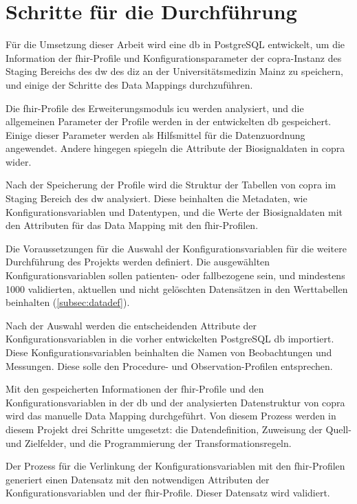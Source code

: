 \section{Schritte für die Durchführung} \label{sec:steps}

Für die Umsetzung dieser Arbeit wird eine \ac{db} in PostgreSQL entwickelt, um die Information der \ac{fhir}-Profile und Konfigurationsparameter der \ac{copra}-Instanz des Staging Bereichs des \ac{dw} des \ac{diz} an der Universitätsmedizin Mainz zu speichern, und einige der Schritte des Data Mappings durchzuführen.

Die \ac{fhir}-Profile des Erweiterungsmoduls \glqq\ac{icu}\grqq{} werden analysiert, und die allgemeinen Parameter der Profile werden in der entwickelten \ac{db} gespeichert. Einige dieser Parameter werden als Hilfsmittel für die Datenzuordnung angewendet. Andere hingegen spiegeln die Attribute der Biosignaldaten in \ac{copra} wider.

Nach der Speicherung der Profile wird die Struktur der Tabellen von \ac{copra} im Staging Bereich des \ac{dw} analysiert. Diese beinhalten die Metadaten, wie Konfigurationsvariablen und Datentypen, und die Werte der Biosignaldaten mit den Attributen für das Data Mapping mit den \ac{fhir}-Profilen. 

Die Voraussetzungen für die Auswahl der Konfigurationsvariablen für die weitere Durchführung des Projekts werden definiert. Die ausgewählten Konfigurationsvariablen sollen patienten- oder fallbezogene sein, und mindestens 1000 validierten, aktuellen und nicht gelöschten Datensätzen in den Werttabellen beinhalten (\ref{subsec:datadef}).

Nach der Auswahl werden die entscheidenden Attribute der Konfigurationsvariablen in die vorher entwickelten PostgreSQL \ac{db} importiert. Diese Konfigurationsvariablen beinhalten die Namen von Beobachtungen und Messungen. Diese solle den \glqq Procedure\grqq{}- und \glqq Observation\grqq{}-Profilen entsprechen.

Mit den gespeicherten Informationen der \ac{fhir}-Profile und den Konfigurationsvariablen in der \ac{db} und der analysierten Datenstruktur von \ac{copra} wird das manuelle Data Mapping durchgeführt. Von diesem Prozess werden in diesem Projekt drei Schritte umgesetzt: die Datendefinition, Zuweisung der Quell- und Zielfelder, und die Programmierung der Transformationsregeln.

Der Prozess für die Verlinkung der Konfigurationsvariablen mit den \ac{fhir}-Profilen generiert einen Datensatz mit den notwendigen Attributen der Konfigurationsvariablen und der \ac{fhir}-Profile. Dieser Datensatz wird validiert.

